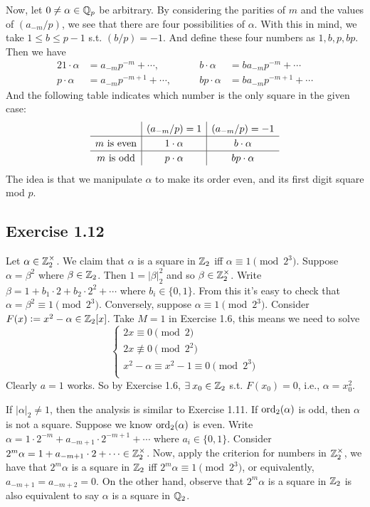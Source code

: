 \documentclass[../Koblitz.tex]{subfiles}
\begin{document}
Now, let $0\neq\alpha\in\mathbb{Q}_p$ be arbitrary. By considering the parities of $m$ and the values of $(a_{-m}/p)$, we see that there are four possibilities of $\alpha$. With this in mind, we take $1\leq b\leq p-1$ s.t. $(b/p)=-1$. And define these four numbers as $1,b,p,bp$. Then we have
\begin{alignat*}{2}
    1\cdot\alpha &= a_{-m}p^{-m}+\cdots, &\qquad b\cdot\alpha &= ba_{-m}p^{-m}+\cdots \\
    p\cdot\alpha &= a_{-m}p^{-m+1}+\cdots, &\qquad bp\cdot\alpha &= ba_{-m}p^{-m+1}+\cdots
\end{alignat*}
And the following table indicates which number is the only square in the given case:
$$
\def\arraystretch{1.2}
\begin{array}{c|c|c}
     & (a_{-m}/p)=1 & (a_{-m}/p)=-1 \\
    \hline
    m \text{ is even} & 1\cdot\alpha & b\cdot\alpha \\
    \hline
    m \text{ is odd} & p\cdot\alpha & bp\cdot\alpha
\end{array}
$$
The idea is that we manipulate $\alpha$ to make its order even, and its first digit square mod $p$.

\subsection*{Exercise 1.12}

Let $\alpha\in\mathbb{Z}_2^\times$. We claim that $\alpha$ is a square in $\mathbb{Z}_2$ iff
$\alpha\equiv 1\pmod{2^3}$. Suppose $\alpha=\beta^2$ where $\beta\in\mathbb{Z}_2$. Then $1=|\beta|_2^2$ and so $\beta\in\mathbb{Z}_2^\times$. Write $\beta=1+b_1\cdot2+b_2\cdot2^2+\cdots$ where $b_i\in\{0,1\}$. From this it's easy to check that $\alpha=\beta^2\equiv 1\pmod{2^3}$. Conversely, suppose $\alpha\equiv1\pmod{2^3}$. Consider $F(x):=x^2-\alpha\in\mathbb{Z}_2[x]$. Take $M=1$ in Exercise 1.6, this means we need to solve
$$
\begin{cases*}
    2x \equiv0\pmod{2} \\
    2x \not\equiv0\pmod{2^2} \\
    x^2-\alpha \equiv x^2-1 \equiv0 \pmod{2^3} \\
\end{cases*}
$$
Clearly $a=1$ works. So by Exercise 1.6, $\exists x_0\in\ZZ_2$ s.t. $F(x_0)=0$, i.e., $\alpha=x_0^2$.

If $|\alpha|_2\neq 1$, then the analysis is similar to Exercise 1.11. If $\operatorname{ord}_2(\alpha)$ is odd, then $\alpha$ is not a square. Suppose we know $\operatorname{ord}_2(\alpha)$ is even. Write $\alpha=1\cdot2^{-m}+a_{-m+1}\cdot2^{-m+1}+\cdots$ where $a_i\in\{0,1\}$. Consider $2^m\alpha =1+a_{-m+1}\cdot2+\cdots \in\mathbb{Z}_2^\times$. Now, apply the criterion for numbers in $\mathbb{Z}_2^\times$, we have that $2^m\alpha$ is a square in $\mathbb{Z}_2$ iff $2^m\alpha\equiv 1 \pmod{2^3}$, or equivalently, $a_{-m+1}=a_{-m+2}=0$. On the other hand, observe that $2^m\alpha$ is a square in $\mathbb{Z}_2$ is also equivalent to say $\alpha$ is a square in $\mathbb{Q}_2$.
\end{document}
